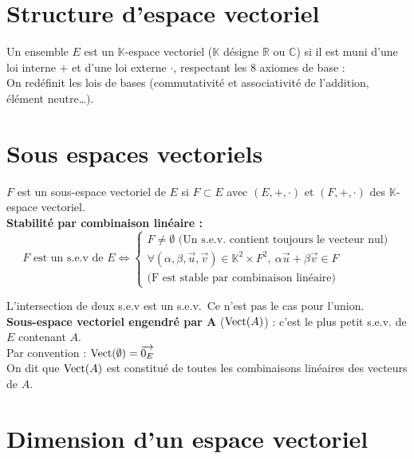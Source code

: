 \section{Structure d'espace vectoriel}\label{sec:structure-d'espace-vectoriel}
  
  Un ensemble $E$ est un $\mathbb K$-espace vectoriel ($\mathbb K$ désigne $\mathbb{R}$ ou $\mathbb{C}$) si il est muni d'une loi interne $\textbf{+}$ et d'une loi externe \textbf{$\cdot$}, respectant les 8 axiomes de base :\\
  
  On redéfinit les lois de bases (commutativité et associativité de l'addition, élément neutre\ldots).


\section{Sous espaces vectoriels}\label{sec:sous-espaces-vectoriels}
  
  $F$ est un sous-espace vectoriel de $E$ si $F \subset E$ avec $(E, +, \cdot)$ et $(F, +, \cdot)$ des $\mathbb K$-espace vectoriel.\\
  
  \textbf{Stabilité par combinaison linéaire :}
  \begin{equation}
    F \text{ est un s.e.v de } E \iff
    \begin{cases}
      F \neq \emptyset \text{ (Un s.e.v. contient toujours le vecteur nul)}\\
      \forall (\alpha, \beta, \vec u, \vec v) \in \mathbb{K}^2 \times F^2,\ \alpha \vec u + \beta \vec v \in F\\
      \text{(F est stable par combinaison linéaire)}
    \end{cases}\label{eq:equation2}
  \end{equation}
  
  L'intersection de deux s.e.v est un s.e.v.\ Ce n'est pas le cas pour l'union.\\
  
  \textbf{Sous-espace vectoriel engendré par A} ($\operatorname{Vect}(A)$) : c'est le plus petit s.e.v. de $E$ contenant $A$.\\
  Par convention : $\operatorname{Vect}(\emptyset) = {\overrightarrow{0_E}}$\\
  On dit que $\operatorname{Vect}(A)$ est constitué de toutes les combinaisons linéaires des vecteurs de $A$.


\section{Dimension d'un espace vectoriel}\label{sec:dimension-d'un-espace-vectoriel}
  
